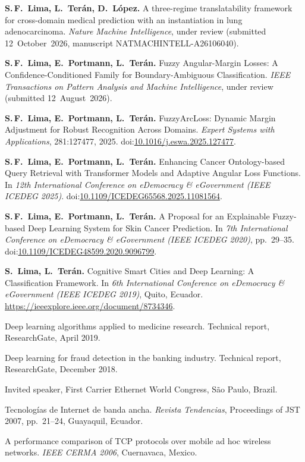 \begin{cvlist}
  \item[2026] \textbf{S.\,F.\ Lima, L.\ Ter\'an, D.\ L\'opez.}
    A three-regime translatability framework for cross-domain medical
    prediction with an instantiation in lung adenocarcinoma.
    \emph{Nature Machine Intelligence}, under review (submitted
    12~October~2026, manuscript NATMACHINTELL-A26106040).
  \item[2026] \textbf{S.\,F.\ Lima, E.\ Portmann, L.\ Ter\'an.}
    Fuzzy Angular-Margin Losses: A Confidence-Conditioned Family for
    Boundary-Ambiguous Classification.
    \emph{IEEE Transactions on Pattern Analysis and Machine Intelligence},
    under review (submitted 12~August~2026).
  \item[2025] \textbf{S.\,F.\ Lima, E.\ Portmann, L.\ Ter\'an.}
    FuzzyArcLoss: Dynamic Margin Adjustment for Robust Recognition Across
    Domains. \emph{Expert Systems with Applications}, 281:127477, 2025.
    doi:\href{https://doi.org/10.1016/j.eswa.2025.127477}{10.1016/j.eswa.2025.127477}.
  \item[2025] \textbf{S.\,F.\ Lima, E.\ Portmann, L.\ Ter\'an.}
    Enhancing Cancer Ontology-based Query Retrieval with Transformer Models
    and Adaptive Angular Loss Functions. In \emph{12th International
    Conference on eDemocracy \& eGovernment (IEEE ICEDEG 2025)}.
    doi:\href{https://doi.org/10.1109/ICEDEG65568.2025.11081564}{10.1109/ICEDEG65568.2025.11081564}.
  \item[2020] \textbf{S.\,F.\ Lima, E.\ Portmann, L.\ Ter\'an.}
    A Proposal for an Explainable Fuzzy-based Deep Learning System for Skin
    Cancer Prediction. In \emph{7th International Conference on eDemocracy
    \& eGovernment (IEEE ICEDEG 2020)}, pp.~29--35.
    doi:\href{https://doi.org/10.1109/ICEDEG48599.2020.9096799}{10.1109/ICEDEG48599.2020.9096799}.
  \item[2019] \textbf{S.\ Lima, L.\ Ter\'an.}
    Cognitive Smart Cities and Deep Learning: A Classification Framework.
    In \emph{6th International Conference on eDemocracy \& eGovernment
    (IEEE ICEDEG 2019)}, Quito, Ecuador.
    \url{https://ieeexplore.ieee.org/document/8734346}.
\end{cvlist}

\begin{cvlist}
  \item[2019] Deep learning algorithms applied to medicine research.
    Technical report, ResearchGate, April 2019.
  \item[2018] Deep learning for fraud detection in the banking industry.
    Technical report, ResearchGate, December 2018.
  \item[2010] Invited speaker, First Carrier Ethernet World Congress,
    S\~ao Paulo, Brazil.
  \item[2007] Tecnolog\'ias de Internet de banda ancha. \emph{Revista
    Tendencias}, Proceedings of JST 2007, pp.~21--24, Guayaquil, Ecuador.
  \item[2006] A performance comparison of TCP protocols over mobile ad hoc
    wireless networks. \emph{IEEE CERMA 2006}, Cuernavaca, Mexico.
\end{cvlist}

